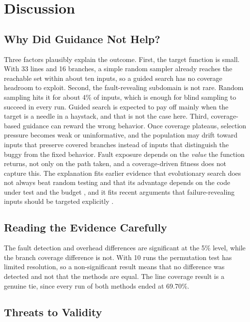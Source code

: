 \documentclass[12pt,onecolumn]{IEEEtran}
\begin{document}
\section{Discussion}

\subsection{Why Did Guidance Not Help?}

Three factors plausibly explain the outcome. First, the target function is small. With 33 lines and 16 branches, a simple random sampler already reaches the reachable set within about ten inputs, so a guided search has no coverage headroom to exploit. Second, the fault-revealing subdomain is not rare. Random sampling hits it for about 4\% of inputs, which is enough for blind sampling to succeed in every run. Guided search is expected to pay off mainly when the target is a needle in a haystack, and that is not the case here. Third, coverage-based guidance can reward the wrong behavior. Once coverage plateaus, selection pressure becomes weak or uninformative, and the population may drift toward inputs that preserve covered branches instead of inputs that distinguish the buggy from the fixed behavior. Fault exposure depends on the \emph{value} the function returns, not only on the path taken, and a coverage-driven fitness does not capture this. The explanation fits earlier evidence that evolutionary search does not always beat random testing and that its advantage depends on the code under test and the budget \cite{shamshiri2018,rojas2017}, and it fits recent arguments that failure-revealing inputs should be targeted explicitly \cite{sorokin2025}.

\subsection{Reading the Evidence Carefully}

The fault detection and overhead differences are significant at the 5\% level, while the branch coverage difference is not. With 10 runs the permutation test has limited resolution, so a non-significant result means that no difference was detected and not that the methods are equal. The line coverage result is a genuine tie, since every run of both methods ended at 69.70\%.

\subsection{Threats to Validity}
\end{document}
